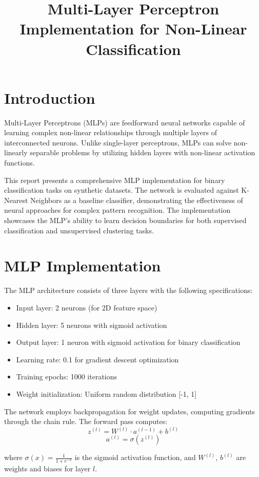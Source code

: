 \documentclass[11pt,a4paper]{article}
\title{Multi-Layer Perceptron Implementation for Non-Linear Classification}
\author{}
\date{}
\begin{document}
\maketitle

\section{Introduction}

Multi-Layer Perceptrons (MLPs) are feedforward neural networks capable of learning complex non-linear relationships through multiple layers of interconnected neurons. Unlike single-layer perceptrons, MLPs can solve non-linearly separable problems by utilizing hidden layers with non-linear activation functions.

This report presents a comprehensive MLP implementation for binary classification tasks on synthetic datasets. The network is evaluated against K-Nearest Neighbors as a baseline classifier, demonstrating the effectiveness of neural approaches for complex pattern recognition. The implementation showcases the MLP's ability to learn decision boundaries for both supervised classification and unsupervised clustering tasks.

\section{MLP Implementation}

The MLP architecture consists of three layers with the following specifications:
\begin{itemize}
\item Input layer: 2 neurons (for 2D feature space)
\item Hidden layer: 5 neurons with sigmoid activation
\item Output layer: 1 neuron with sigmoid activation for binary classification
\item Learning rate: 0.1 for gradient descent optimization
\item Training epochs: 1000 iterations
\item Weight initialization: Uniform random distribution [-1, 1]
\end{itemize}

The network employs backpropagation for weight updates, computing gradients through the chain rule. The forward pass computes:
$$z^{(l)} = W^{(l)} \cdot a^{(l-1)} + b^{(l)}$$
$$a^{(l)} = \sigma(z^{(l)})$$

where $\sigma(x) = \frac{1}{1 + e^{-x}}$ is the sigmoid activation function, and $W^{(l)}$, $b^{(l)}$ are weights and biases for layer $l$.
\end{document}
